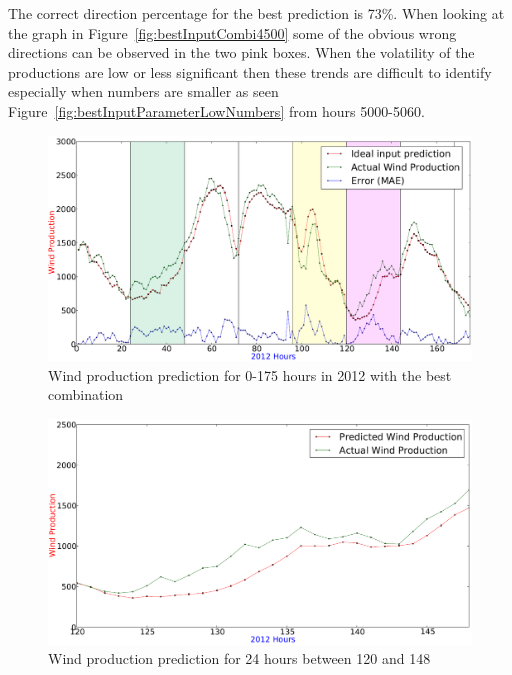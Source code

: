 The correct direction percentage for the best prediction is 73\%. When looking at the graph in Figure~\ref{fig:bestInputCombi4500} some of the obvious wrong directions can be observed in the two pink boxes. When the volatility of the productions are low or less significant then these trends are difficult to identify especially when numbers are smaller as seen Figure~\ref{fig:bestInputParameterLowNumbers} from hours 5000-5060.

\begin{figure}[H]
\centering
\includegraphics[width=0.99\linewidth]{billeder/bestInputParameterPrediction.png}
\caption{Wind production prediction for 0-175 hours in 2012 with the best combination}
\label{fig:bestInputParameterPrediction}
\end{figure} 

\begin{figure}[H]
\centering
\includegraphics[width=0.99\linewidth]{billeder/bestInputCombi120-148.png}
\caption{Wind production prediction for 24 hours between 120 and 148}
\label{fig:bestInputCombi120-148}
\end{figure} 

